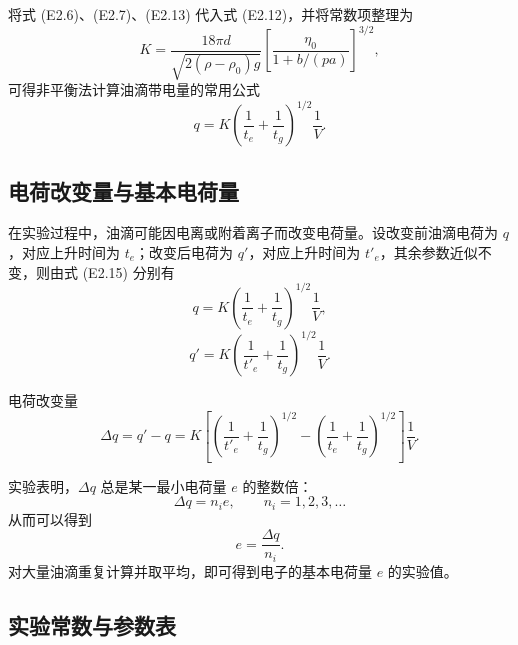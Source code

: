 \documentclass[a4paper,8pt,twocolumn]{article}
\begin{document}
将式 (E2.6)、(E2.7)、(E2.13) 代入式 (E2.12)，并将常数项整理为
\begin{equation}
K=\frac{18\pi d}{\sqrt{2(\rho-\rho_0)g}}
\left[\frac{\eta_0}{1+b/(pa)}\right]^{3/2},
\tag{E2.14}
\end{equation}
可得非平衡法计算油滴带电量的常用公式
\begin{equation}
q=K\left(\frac{1}{t_e}+\frac{1}{t_g}\right)^{1/2}\frac{1}{V}.
\tag{E2.15}
\end{equation}

\subsection{电荷改变量与基本电荷量}

在实验过程中，油滴可能因电离或附着离子而改变电荷量。设改变前油滴电荷为 $q$，对应上升时间为 $t_e$；改变后电荷为 $q'$，对应上升时间为 $t'_e$，其余参数近似不变，则由式 (E2.15) 分别有
\begin{equation}
q=K\left(\frac{1}{t_e}+\frac{1}{t_g}\right)^{1/2}\frac{1}{V},
\tag{E2.16}
\end{equation}
\begin{equation}
q'=K\left(\frac{1}{t'_e}+\frac{1}{t_g}\right)^{1/2}\frac{1}{V}.
\tag{E2.17}
\end{equation}

电荷改变量
\begin{equation}
\Delta q=q'-q
=K\left[\left(\frac{1}{t'_e}+\frac{1}{t_g}\right)^{1/2}
-\left(\frac{1}{t_e}+\frac{1}{t_g}\right)^{1/2}\right]\frac{1}{V}.
\tag{E2.18}
\end{equation}

实验表明，$\Delta q$ 总是某一最小电荷量 $e$ 的整数倍：
\begin{equation}
\Delta q=n_ie,\qquad n_i=1,2,3,\dots
\tag{E2.19}
\end{equation}
从而可以得到
\begin{equation}
e=\frac{\Delta q}{n_i}.
\tag{E2.20}
\end{equation}
对大量油滴重复计算并取平均，即可得到电子的基本电荷量 $e$ 的实验值。

\subsection{实验常数与参数表}
\end{document}
